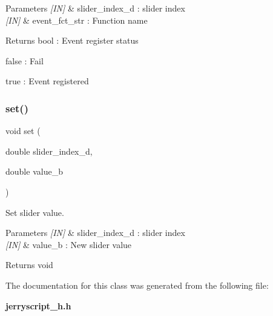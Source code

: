 \begin{DoxyParams}{Parameters}
{\em \mbox{[}\+I\+N\mbox{]}} & slider\+\_\+index\+\_\+d \+: slider index \\
\hline
{\em \mbox{[}\+I\+N\mbox{]}} & event\+\_\+fct\+\_\+str \+: Function name \\
\hline
\end{DoxyParams}
\begin{DoxyReturn}{Returns}
bool \+: Event register status \begin{DoxyItemize}
\item false \+: Fail \item true \+: Event registered \end{DoxyItemize}

\end{DoxyReturn}
\mbox{\label{classslider_ac2443195b61f62cc9a960e1313e94322}} 
\subsubsection{set()}
{\footnotesize\ttfamily void set (\begin{DoxyParamCaption}\item[{double}]{slider\+\_\+index\+\_\+d,  }\item[{double}]{value\+\_\+b }\end{DoxyParamCaption})}



Set slider value. 


\begin{DoxyCode}{0}
\end{DoxyCode}



\begin{DoxyParams}{Parameters}
{\em \mbox{[}\+I\+N\mbox{]}} & slider\+\_\+index\+\_\+d \+: slider index \\
\hline
{\em \mbox{[}\+I\+N\mbox{]}} & value\+\_\+b \+: New slider value \\
\hline
\end{DoxyParams}
\begin{DoxyReturn}{Returns}
void 
\end{DoxyReturn}


The documentation for this class was generated from the following file\+:\begin{DoxyCompactItemize}
\item 
\textbf{ jerryscript\+\_\+h.\+h}\end{DoxyCompactItemize}
